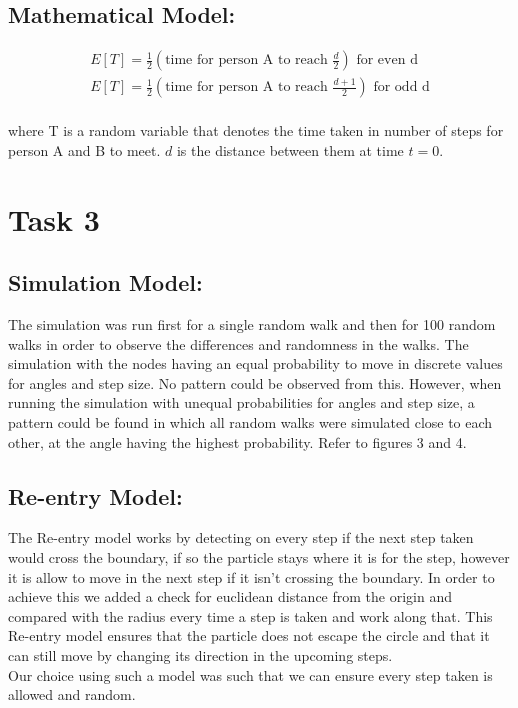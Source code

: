 \documentclass[10pt, a4paper]{article}
\begin{document}
\subsection*{Mathematical Model:}
\begin{align*}
    E[T] = \frac{1}{2}(\text{time for person A to reach }\frac{d}{2})\text{ for even d}\\
    E[T] = \frac{1}{2}(\text{time for person A to reach }\frac{d+1}{2})\text{ for odd d}\\
\end{align*}

where T is a random variable that denotes the time taken in number of steps for person A and B to meet.
$d$ is the distance between them at time $t = 0$.


\section*{Task 3}
\subsection*{Simulation Model:}
The simulation was run first for a single random walk and then for 100 random walks in order to observe the differences and randomness in the walks. The simulation with the nodes having an equal probability to move in discrete values for angles and step size. No pattern could be observed from this. However, when running the simulation with unequal probabilities for angles and step size, a pattern could be found in which all random walks were simulated close to each other, at the angle having the highest probability.
Refer to figures 3 and 4.

\subsection*{Re-entry Model:}
The Re-entry model works by detecting on every step if the next step taken would cross the boundary, if so the particle stays where it is for the step, however it is allow to move in the next step if it isn't crossing the boundary. In order to achieve this we added a check for euclidean distance from the origin and compared with the radius every time a step is taken and work along that. This Re-entry model ensures that the particle does not escape the circle and that it can still move by changing its direction in the upcoming steps.\\
Our choice using such a model was such that we can ensure every step taken is allowed and random.
\end{document}
